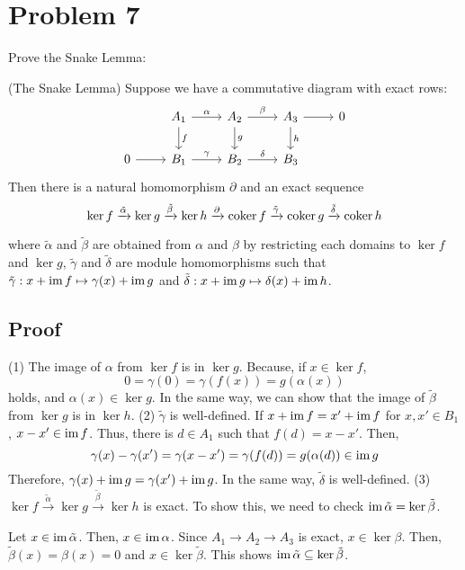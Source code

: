\section*{Problem 7}

Prove the Snake Lemma:
\begin{theorem} (The Snake Lemma)
  Suppose we have a commutative diagram with exact rows:
  \[
  \begin{tikzcd}
    & A_1 \ar["\alpha"]{r} \ar["f"]{d}
    & A_2 \ar["\beta"]{r} \ar["g"]{d}
    & A_3 \ar{r} \ar["h"]{d}
    & 0
    \\ 0 \ar{r}
    & B_1 \ar["\gamma"]{r}
    & B_2 \ar["\delta"]{r}
    & B_3
    &
  \end{tikzcd}
  \]
  Then there is a natural homomorphism \(\partial\)
  and an exact sequence
  \[
  \ker f \xrightarrow{\tilde\alpha}
  \ker g \xrightarrow{\tilde\beta}
  \ker h
  \xrightarrow{\partial}
  \textnormal{coker}\, f \xrightarrow{\tilde\gamma}
  \textnormal{coker}\, g \xrightarrow{\tilde\delta}
  \textnormal{coker}\, h
  \]
\end{theorem}
where \(\tilde\alpha\) and \(\tilde\beta\) are obtained from \(\alpha\) and \(\beta\) by restricting each domains to \(\ker f\) and \(\ker g\),
\(\tilde\gamma\) and \(\tilde\delta\) are module homomorphisms such that \(\tilde\gamma: x + \textnormal{im}\, f \mapsto \gamma(x) + \textnormal{im}\, g\) and \(\tilde\delta: x + \textnormal{im}\, g \mapsto \delta(x) + \textnormal{im}\, h\).


\subsection*{Proof}

(1) The image of \(\alpha\) from \(\ker f\) is in \(\ker g\).
Because, if \(x \in \ker f\),
\[0 = \gamma(0) = \gamma(f(x)) = g(\alpha(x))\]
holds, and \(\alpha(x) \in \ker g\).
In the same way, we can show that the image of \(\tilde\beta\) from \(\ker g\) is in \(\ker h\).
\br
\noindent
(2)
\(\tilde\gamma\) is well-defined. If \(x + \textnormal{im}\, f = x' + \textnormal{im}\, f\) for \(x, x' \in B_1\), \(x - x' \in \textnormal{im}\, f\). Thus, there is \(d \in A_1\) such that \(f(d) = x - x'\). Then,
\[\gamma(x) - \gamma(x') = \gamma(x - x') = \gamma(f(d)) = g(\alpha(d)) \in \textnormal{im}\, g\]
Therefore, \(\gamma(x) + \textnormal{im}\, g = \gamma(x') + \textnormal{im}\, g\).
In the same way, \(\tilde\delta\) is well-defined.
\br
\noindent
(3)
\(\ker f \xrightarrow{\tilde\alpha} \ker g \xrightarrow{\tilde\beta} \ker h\) is exact.
To show this, we need to check \(\textnormal{im}\, \tilde\alpha = \ker \tilde\beta\).

Let \(x \in \textnormal{im}\,\tilde\alpha\).
Then, \(x \in \textnormal{im}\,\alpha\).
Since \(A_1 \to A_2 \to A_3\) is exact, \(x \in \ker\beta\).
Then, \(\tilde\beta(x) = \beta(x) = 0\) and \(x \in \ker\tilde\beta\).
This shows \(\textnormal{im}\,\tilde\alpha \subseteq \ker\tilde\beta\).

